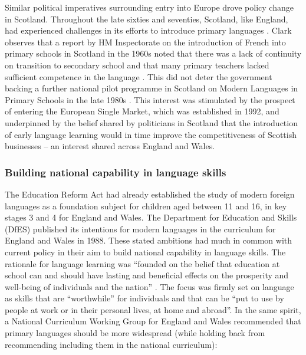 \documentclass[output=paper]{langscibook}
\begin{document}
\begin{sloppypar}
Similar political imperatives surrounding entry into Europe drove policy change in Scotland. Throughout the late sixties and seventies, Scotland, like England, had experienced challenges in its efforts to introduce primary languages \citep{Johnstone1996}. Clark observes that a report by HM Inspectorate on the introduction of French into primary schools in Scotland in the 1960s noted that there was a lack of continuity on transition to secondary school and that many primary teachers lacked sufficient competence in the language \citep{Clark1998}. This did not deter the government backing a further national pilot programme in Scotland on Modern Languages in Primary Schools in the late 1980s \citep{Johnstone1996}. This interest was stimulated by the prospect of entering the European Single Market, which was established in 1992, and underpinned by the belief shared by politicians in Scotland that the introduction of early language learning would in time improve the competitiveness of Scottish businesses \citep{Johnstone1996} -- an interest shared across England and Wales.  
\end{sloppypar}

\subsubsection{Building national capability in language skills}

The Education Reform Act \citep{DfES1988} had already established the study of modern foreign languages as a foundation subject for children aged between 11 and 16, in key stages 3 and 4 for England and Wales. The Department for Education and Skills (DfES) published its intentions for modern languages in the curriculum for England and Wales in 1988. These stated ambitions had much in common with current policy in their aim to build national capability in language skills. The rationale for language learning was ``founded on the belief that education at school can and should have lasting and beneficial effects on the prosperity and well-being of individuals and the nation'' \citep[1]{DfES1988}. The focus was firmly set on language as skills that are ``worthwhile'' for individuals and that can be ``put to use by people at work or in their personal lives, at home and abroad''. In the same spirit, a National Curriculum Working Group for England and Wales recommended that primary languages should be more widespread (while holding back from recommending including them in the national curriculum):
\end{document}

